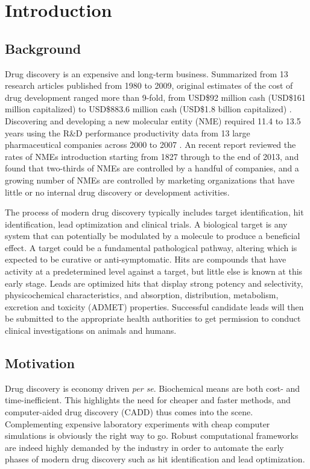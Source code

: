 \chapter{Introduction}

\section{Background}

Drug discovery is an expensive and long-term business. Summarized from 13 research articles published from 1980 to 2009, original estimates of the cost of drug development ranged more than 9-fold, from USD\$92 million cash (USD\$161 million capitalized) to USD\$883.6 million cash (USD\$1.8 billion capitalized) \citep{1431}. Discovering and developing a new molecular entity (NME) required 11.4 to 13.5 years using the R\&D performance productivity data from 13 large pharmaceutical companies across 2000 to 2007 \citep{716}. An recent report \citep{1427} reviewed the rates of NMEs introduction starting from 1827 through to the end of 2013, and found that two-thirds of NMEs are controlled by a handful of companies, and a growing number of NMEs are controlled by marketing organizations that have little or no internal drug discovery or development activities.

The process of modern drug discovery typically includes target identification, hit identification, lead optimization and clinical trials. A biological target is any system that can potentially be modulated by a molecule to produce a beneficial effect. A target could be a fundamental pathological pathway, altering which is expected to be curative or anti-symptomatic. Hits are compounds that have activity at a predetermined level against a target, but little else is known at this early stage. Leads are optimized hits that display strong potency and selectivity, physicochemical characteristics, and absorption, distribution, metabolism, excretion and toxicity (ADMET) properties. Successful candidate leads will then be submitted to the appropriate health authorities to get permission to conduct clinical investigations on animals and humans.

\section{Motivation}

Drug discovery is economy driven \textit{per se}. Biochemical means are both cost- and time-inefficient. This highlights the need for cheaper and faster methods, and computer-aided drug discovery (CADD) thus comes into the scene. Complementing expensive laboratory experiments with cheap computer simulations is obviously the right way to go. Robust computational frameworks are indeed highly demanded by the industry in order to automate the early phases of modern drug discovery such as hit identification and lead optimization.

